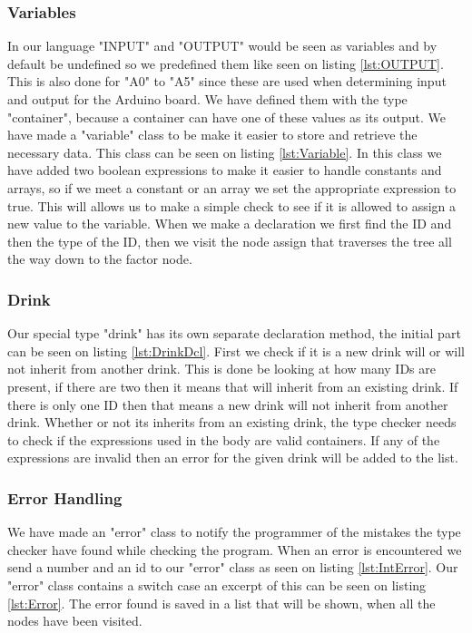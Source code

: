 \subsubsection{Variables}
In our language "INPUT" and "OUTPUT" would be seen as variables and by default be undefined so we predefined them like seen on listing \ref{lst:OUTPUT}. This is also done for "A0" to "A5" since these are used when determining input and output for the Arduino board. We have defined them with the type "container", because a container can have one of these values as its output.
We have made a "variable" class to be make it easier to store and retrieve the necessary data. This class can be seen on listing \ref{lst:Variable}. In this class we have added two boolean expressions to make it easier to handle constants and arrays, so if we meet a constant or an array we set the appropriate expression to true. This will allows us to make a simple check to see if it is allowed to assign a new value to the variable.
When we make a declaration we first find the ID and then the type of the ID, then we visit the node assign that traverses the tree all the way down to the factor node.

\subsubsection{Drink}
Our special type "drink" has its own separate declaration method, the initial part can be seen on listing \ref{lst:DrinkDcl}. First we check if it is a new drink will or will not inherit from another drink. This is done be looking at how many IDs are present, if there are two then it means that will inherit from an existing drink. If there is only one ID then that means a new drink will not inherit from another drink.
Whether or not its inherits from an existing drink, the type checker needs to check if the expressions used in the body are valid containers. If any of the expressions are invalid then an error for the given drink will be added to the list.

\subsubsection{Error Handling}
We have made an "error" class to notify the programmer of the mistakes the type checker have found while checking the program. When an error is encountered we send a number and an id to our "error" class as seen on listing \ref{lst:IntError}.
Our "error" class contains a switch case an excerpt of this can be seen on listing \ref{lst:Error}. The error found is saved in a list that will be shown, when all the nodes have been visited.
